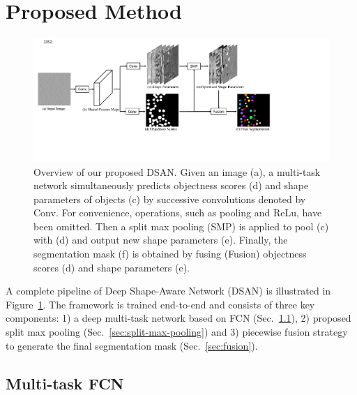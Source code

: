\section{Proposed Method}
\label{sec:method}
\begin{figure}
    \begin{center}
        \includegraphics[width=6.7in]{figures/FigDSAN.pdf}
    \end{center}
    \caption{Overview of our proposed DSAN. Given an image (a), a multi-task network simultaneously predicts objectness scores (d) and shape parameters of objects (c) by successive convolutions denoted by Conv.
    For convenience, operations, such as pooling and ReLu, have been omitted.
    Then a split max pooling (SMP) is applied to pool (c) with (d) and output new shape parameters (e).
    Finally, the segmentation mask (f) is obtained by fusing (Fusion) objectness scores (d) and shape parameters (e).}
    \label{FigDSAN}
\end{figure}

A complete pipeline of Deep Shape-Aware Network (DSAN) is illustrated in Figure~\ref{FigDSAN}.
The framework is trained end-to-end and consists of three key components:
1) a deep multi-task network based on FCN (Sec.~\ref{sec:multi-task-fcn}),
2) proposed split max pooling (Sec.~\ref{sec:split-max-pooling}) and
3) piecewise fusion strategy to generate the final segmentation mask (Sec.~\ref{sec:fusion}).

\subsection{Multi-task FCN}
\label{sec:multi-task-fcn}


